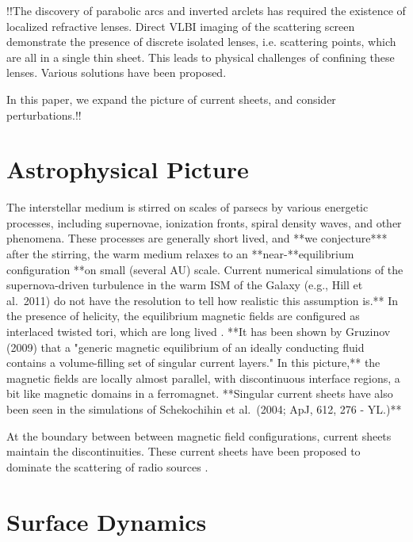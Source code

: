 \documentclass[useAMS,usenatbib]{mn2e}
\begin{document}
!!The discovery of parabolic arcs\citep{2001ApJ...549L..97S} and
inverted arclets has required the existence of localized refractive
lenses.  Direct VLBI imaging of the scattering
screen\citep{2010ApJ...708..232B} demonstrate the presence of
discrete isolated lenses, i.e. scattering points, which are all in a
single thin sheet. This leads to physical challenges of confining
these lenses. Various solutions have been
proposed\citep{2007ASPC..365..299W,2012MNRAS.421L.132P,2006ApJ...640L.159G}.

In this paper, we expand the picture of current sheets, and consider
perturbations.!!


\section{Astrophysical Picture}

The interstellar medium is stirred on scales of parsecs by various
energetic processes, including supernovae, ionization fronts, spiral
density waves, and other phenomena.  These processes are generally
short lived, and **we conjecture*** after the stirring, the warm medium relaxes to an
**near-**equilibrium configuration **on small (several AU) scale. Current numerical
simulations of the supernova-driven turbulence in the warm ISM of the Galaxy (e.g., Hill et al.~2011)
do not have the resolution to tell how realistic this assumption is.**  In the presence of helicity, the
equilibrium magnetic fields are configured as interlaced twisted tori,
which are long lived \citep{2004Natur.431..819B}.  **It has been shown by Gruzinov (2009)
that a "generic magnetic equilibrium of an ideally conducting fluid contains a volume-filling set of singular current layers." In this picture,** the magnetic fields
are locally almost parallel, with discontinuous interface regions, a
bit like magnetic domains in a ferromagnet. **Singular current sheets have also been seen in the
simulations of Schekochihin et al.~(2004; ApJ, 612, 276 -  YL.)**

At the boundary between between magnetic field configurations, current
sheets maintain the discontinuities.  These current sheets have been
proposed to dominate the scattering of radio
sources \citep{2006ApJ...640L.159G}.

\section{Surface Dynamics}
\end{document}
